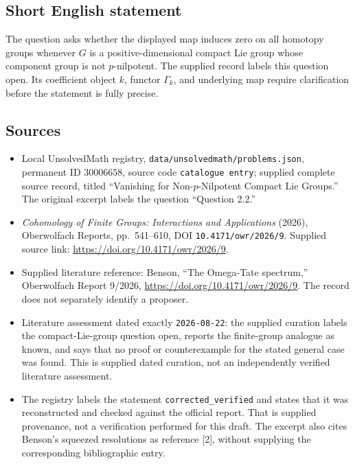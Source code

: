 \documentclass[11pt]{article}
\begin{document}
\subsection{Short English statement}
The question asks whether the displayed map induces zero on all homotopy groups whenever \(G\) is a positive-dimensional compact Lie group whose component group is not \(p\)-nilpotent. The supplied record labels this question open. Its coefficient object \(k\), functor \(\Gamma_k\), and underlying map require clarification before the statement is fully precise.
\subsection{Sources}
\begin{itemize}
\item Local UnsolvedMath registry, \texttt{data/unsolvedmath/problems.json}, permanent ID \(30006658\), source code \texttt{catalogue entry}; supplied complete source record, titled ``Vanishing for Non-\(p\)-Nilpotent Compact Lie Groups.'' The original excerpt labels the question ``Question 2.2.''
\item \emph{Cohomology of Finite Groups: Interactions and Applications} (2026), Oberwolfach Reports, pp.\ 541--610, DOI \texttt{10.4171/owr/2026/9}. Supplied source link: \url{https://doi.org/10.4171/owr/2026/9}.
\item Supplied literature reference: Benson, ``The Omega-Tate spectrum,'' Oberwolfach Report 9/2026, \url{https://doi.org/10.4171/owr/2026/9}. The record does not separately identify a proposer.
\item Literature assessment dated exactly \texttt{2026-08-22}: the supplied curation labels the compact-Lie-group question open, reports the finite-group analogue as known, and says that no proof or counterexample for the stated general case was found. This is supplied dated curation, not an independently verified literature assessment.
\item The registry labels the statement \texttt{corrected\_verified} and states that it was reconstructed and checked against the official report. That is supplied provenance, not a verification performed for this draft. The excerpt also cites Benson's squeezed resolutions as reference [2], without supplying the corresponding bibliographic entry.
\end{itemize}
\end{document}
